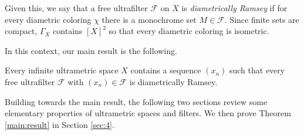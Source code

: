 Given this, we say that a free ultrafilter \( \mathcal{F}  \) on \( X \) is \emph{diametrically Ramsey} if for every diametric coloring \( \chi \) there is a monochrome set \( M  \in \mathcal{F}  \). Since finite sets are compact, \( \Gamma_{X}  \) contains \( [X]^{2}  \) so that every diametric coloring is isometric.

In this context, our main result is the following.
\begin{theorem}
\label{main:result}
Every infinite ultrametric space \( X \) contains a sequence \((x_{n})\) such that every free ultrafilter \( \mathcal{F}  \) with \( (x_{n}) \in \mathcal{F}  \) is diametrically Ramsey.
\end{theorem}

Building towards the main result, the following two sections review some elementary properties of ultrametric spaces and filters. We then prove Theorem \ref{main:result} in Section \ref{sec:4}.
